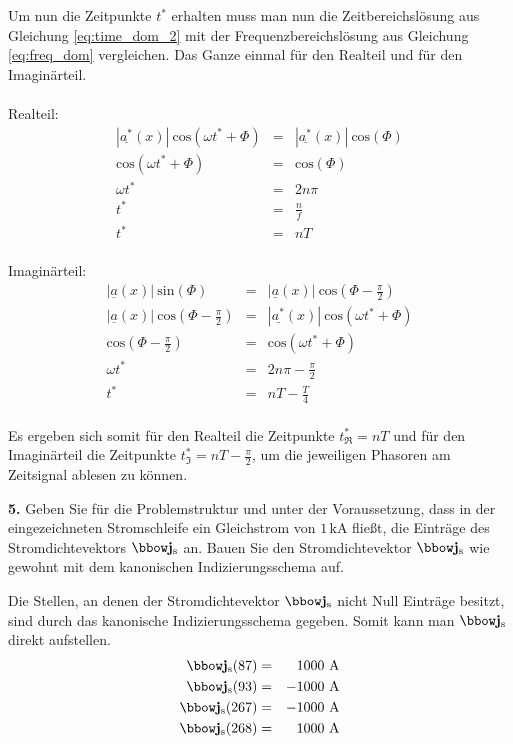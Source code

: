 \documentclass[Protokollheft.tex]{subfiles}
\begin{document}
Um nun die Zeitpunkte $t^*$ erhalten muss man nun die Zeitbereichslösung aus Gleichung \ref{eq:time_dom_2} mit der Frequenzbereichslösung aus Gleichung \ref{eq:freq_dom} vergleichen. Das Ganze einmal für den Realteil und für den Imaginärteil.\\
\\
Realteil:
\begin{eqnarray*}
|\underline{a^*}(x)|\ \text{cos}(\omega t^*+\Phi)&=&|\underline{a^*}(x)|\ \text{cos}(\Phi)\\
\text{cos}(\omega t^*+\Phi)&=&\text{cos}(\Phi)\\
\omega t^*&=&2n\pi\\
t^*&=&\frac{n}{f}\\
t^*&=&nT
\end{eqnarray*}
\\
Imaginärteil:
\begin{eqnarray*}
|\underline{a}(x)|\ \text{sin}(\Phi)&=&|\underline{a}(x)|\ \text{cos}(\Phi-\frac{\pi}{2})\\
|\underline{a}(x)|\ \text{cos}(\Phi-\frac{\pi}{2})&=&|\underline{a^*}(x)|\ \text{cos}(\omega t^*+\Phi)\\
\text{cos}(\Phi-\frac{\pi}{2})&=&\text{cos}(\omega t^*+\Phi)\\
\omega t^*&=&2n\pi-\frac{\pi}{2}\\
t^*&=&nT-\frac{T}{4}
\end{eqnarray*}
\\
Es ergeben sich somit für den Realteil die Zeitpunkte $t^*_{\Re}=nT$ und für den Imaginärteil die Zeitpunkte $t^*_{\Im}=nT-\frac{\pi}{2}$, um die jeweiligen Phasoren am Zeitsignal ablesen zu können.

\begin{framed}
	\noindent \textbf{5.} Geben Sie für die Problemstruktur und unter der Voraussetzung, dass in der eingezeichneten Stromschleife ein Gleichstrom von $1\,\text{kA}$
      fließt, die Einträge des Stromdichtevektors $\jfit_\text{s}$ an. Bauen Sie den Stromdichtevektor $\jfit_\text{s}$ wie gewohnt mit dem kanonischen Indizierungsschema auf.\label{exer:calcCurrentExcitation}
\end{framed}
\noindent
Die Stellen, an denen der Stromdichtevektor $\jfit_\text{s}$ nicht Null Einträge besitzt, sind durch das kanonische Indizierungsschema gegeben. Somit kann man $\jfit_\text{s}$ direkt aufstellen.
\begin{eqnarray*}
	\jfit_\text{s}(87)&=&1000\ \text{A}\\
	\jfit_\text{s}(93)&=&-1000\ \text{A}\\
	\jfit_\text{s}(267)&=&-1000\ \text{A}\\
	\jfit_\text{s}(268)&=&1000\ \text{A}\\
\end{eqnarray*}
\end{document}
